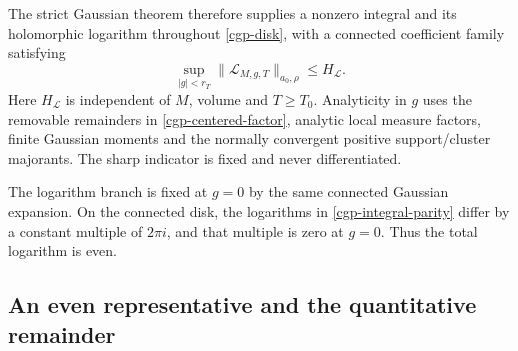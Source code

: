 \documentclass[11pt]{article}
\theoremstyle{remark}
\begin{document}
The strict Gaussian theorem therefore supplies a nonzero
integral and its holomorphic logarithm throughout
\eqref{cgp-disk}, with a connected coefficient family satisfying
\begin{equation}
             \sup_{|g|<r_T}
               \|\mathcal L_{M,g,T}\|_{a_0,\rho}
                         \le H_{\mathcal L}.
 \label{cgp-uniform-log}
\end{equation}
Here $H_{\mathcal L}$ is independent of $M$, volume and
$T\ge T_0$. Analyticity in $g$ uses the removable remainders
in \eqref{cgp-centered-factor}, analytic local measure factors,
finite Gaussian moments and the normally convergent positive
support/cluster majorants. The sharp indicator is fixed and
never differentiated.

The logarithm branch is fixed at $g=0$ by the same connected
Gaussian expansion. On the connected disk, the logarithms
in \eqref{cgp-integral-parity} differ by a constant multiple
of $2\pi i$, and that multiple is zero at $g=0$. Thus the
total logarithm is even.

\subsection{An even representative and the quantitative remainder}
\label{cgp-estimate-section}
\end{document}
